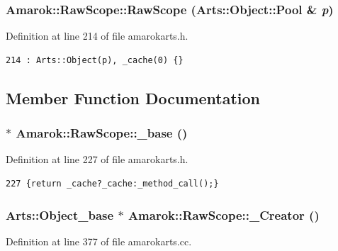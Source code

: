 \subsubsection{\setlength{\rightskip}{0pt plus 5cm}Amarok::Raw\-Scope::Raw\-Scope (Arts::Object::Pool \& {\em p})\hspace{0.3cm}{\tt  [inline]}}\label{classAmarok_1_1RawScope_Amarok_1_1RawScopea5}




Definition at line 214 of file amarokarts.h.



\footnotesize\begin{verbatim}214 : Arts::Object(p), _cache(0) {}
\end{verbatim}\normalsize 


\subsection{Member Function Documentation}
\subsubsection{$\ast$ Amarok::Raw\-Scope::\_\-base ()\hspace{0.3cm}{\tt  [inline]}}\label{classAmarok_1_1RawScope_Amarok_1_1RawScopea9}




Definition at line 227 of file amarokarts.h.



\footnotesize\begin{verbatim}227 {return _cache?_cache:_method_call();}
\end{verbatim}\normalsize 
{}
\subsubsection{\setlength{\rightskip}{0pt plus 5cm}Arts::Object\_\-base $\ast$ Amarok::Raw\-Scope::\_\-Creator ()\hspace{0.3cm}{\tt  [static, private]}}\label{classAmarok_1_1RawScope_Amarok_1_1RawScopeh0}




Definition at line 377 of file amarokarts.cc.

